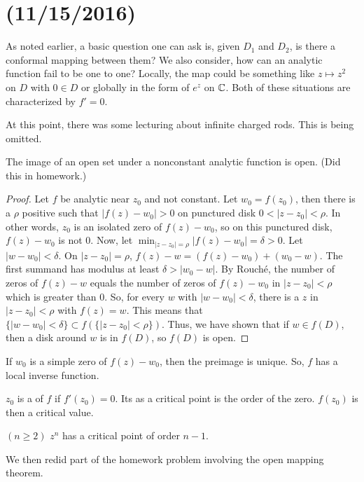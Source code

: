 \documentclass[11pt,leqno,oneside]{amsart}
\numberwithin{thm}{section}
\begin{document}
  \section{(11/15/2016)}
  As noted earlier, a basic question one can ask is, given $D_1$ and
  $D_2$, is there a conformal mapping between them? We also consider,
  how can an analytic function fail to be one to one? Locally, the map
  could be something like $z \mapsto z^2$ on $D$ with $0 \in D$ or
  globally in the form of $e^z$ on ${\mathbb C}$. Both of these situations are
  characterized by $f' = 0$.

  At this point, there was some lecturing about infinite charged
  rods. This is being omitted.

  \begin{thm}
    The image of an open set under a nonconstant analytic function is open. (Did
    this in homework.)
  \end{thm}
  \begin{proof}
    Let $f$ be analytic near $z_0$ and not constant. Let $w_0 =
    f(z_0)$, then there is a $\rho$ positive such that $|f(z)-w_0| >
    0$ on punctured disk $0 < |z-z_0| < \rho$. In other words, $z_0$
    is an isolated zero of $f(z)-w_0$, so on this punctured disk,
    $f(z)-w_0$ is not 0. Now, let $\min_{|z-z_0|=\rho} |f(z)-w_0| =
    \delta > 0$. Let $|w-w_0| < \delta$. On $|z-z_0| = \rho$, $f(z)-w
    = (f(z)-w_0) + (w_0-w)$. The first summand has modulus at least
    $\delta > |w_0-w|$. By Rouch\'{e}, the number of zeros of $f(z)-w$
    equals the number of zeros of $f(z)-w_0$ in $|z-z_0| < \rho$ which
    is greater than 0. So, for every $w$ with $|w-w_0| < \delta$,
    there is a $z$ in $|z-z_0| < \rho$ with $f(z) = w$. This means
    that $\{|w-w_0| < \delta\} \subset f(\{|z-z_0| < \rho\})$. Thus,
    we have shown that if $w \in f(D)$, then a disk around $w$ is in
    $f(D)$, so $f(D)$ is open.
  \end{proof}
  If $w_0$ is a simple zero of $f(z)-w_0$, then the preimage is
  unique. So, $f$ has a local inverse function.
  \begin{defn}
    $z_0$ is a  of $f$ if $f'(z_0) = 0$. Its
     as a critical point is the order of the
    zero. $f(z_0)$ is then a critical value.
  \end{defn}
  \begin{example}
    $(n \geq 2)$ $z^n$ has a critical point of order $n-1$.
  \end{example}
  We then redid part of the homework problem involving the open
  mapping theorem.
\end{document}

